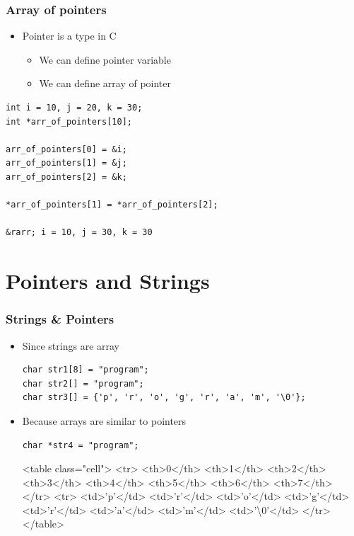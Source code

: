 \documentclass{../c-lecture}
\begin{document}
\begin{frame}[fragile]
  \frametitle{Array of pointers}
  \begin{itemize}
    \item Pointer is a type in C
    \begin{itemize}
      \item We can define pointer variable
      \item We can define array of pointer
    \end{itemize}
  \end{itemize}
  \begin{verbatim}
int i = 10, j = 20, k = 30;
int *arr_of_pointers[10];

arr_of_pointers[0] = &i;
arr_of_pointers[1] = &j;
arr_of_pointers[2] = &k;

*arr_of_pointers[1] = *arr_of_pointers[2];

&rarr; i = 10, j = 30, k = 30
  \end{verbatim}
\end{frame}

\section{Pointers and Strings}

\begin{frame}[fragile]
  \frametitle{Strings \& Pointers}
  \begin{itemize}
    \item Since strings are array
    \begin{verbatim}
char str1[8] = "program";
char str2[] = "program";
char str3[] = {'p', 'r', 'o', 'g', 'r', 'a', 'm', '\0'};
    \end{verbatim}
    \item Because arrays are similar to pointers
    \begin{verbatim}
char *str4 = "program";
    \end{verbatim}
    <table class="cell">
      <tr>
        <th>0</th>
        <th>1</th>
        <th>2</th>
        <th>3</th>
        <th>4</th>
        <th>5</th>
        <th>6</th>
        <th>7</th>
      </tr>
      <tr>
        <td>'p'</td>
        <td>'r'</td>
        <td>'o'</td>
        <td>'g'</td>
        <td>'r'</td>
        <td>'a'</td>
        <td>'m'</td>
        <td>'\textbackslash 0'</td>
      </tr>
    </table>
  \end{itemize}
\end{frame}
\end{document}
